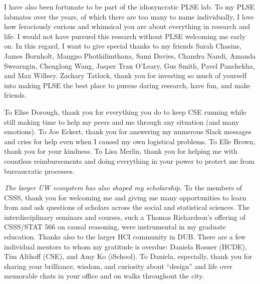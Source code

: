 I have also been fortunate to be part of the idiosyncratic PLSE
lab. 
To my PLSE labmates over the years, of which there are too many to name
individually, I love how ferociously curious and whimsical you are about
everything in research and life. I would not have pursued this
research without PLSE welcoming me early on. In this regard, I want to give
special thanks to my friends Sarah Chasins, James Bornholt, Mangpo Phothilimthana, Sami Davies, Chandra
Nandi, Amanda Swearngin, Chenglong Wang, Jasper Tran O'Leary, Gus Smith, Pavel Panchekha,
and Max Willsey. Zachary Tatlock, thank you for investing so much of yourself
into making PLSE the best place to pursue daring research, have fun, and make
friends. 

To Elise Dorough, thank you for everything you do to keep CSE running while
still making time to help my peers and me through any situation (and many
emotions). To Joe Eckert, thank you for answering my numerous Slack messages
and cries for help even when I caused my own logistical problems. To
Elle Brown, thank you for your kindness. To Lisa Merlin, thank you for
helping me with countless reimbursements and doing everything in your power
to protect me from bureaucratic processes.

\textit{The larger UW ecosystem has also shaped my scholarship.} To the members
of CSSS, thank you for welcoming me and giving me many opportunities to learn
from and ask questions of scholars across the social and statistical sciences.
The interdisciplinary seminars and courses, such a Thomas Richardson's offering
of CSSS/STAT 566 on causal reasoning, were instrumental in my graduate
education. Thanks also to the larger HCI community in DUB. There are a few
individual mentors to whom my gratitude is overdue: Daniela Rosner (HCDE), Tim
Althoff (CSE), and Amy Ko (iSchool). To Daniela, especially, thank you for
sharing your brilliance, wisdom, and curiosity about ``design'' and life over
memorable chats in your office and on walks throughout the city. 

